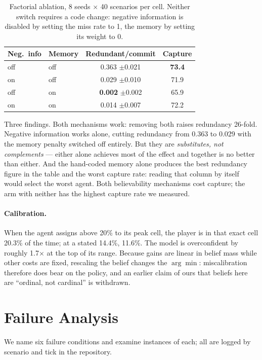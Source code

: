 \documentclass{article}
\begin{document}
\begin{table}[t]
\centering
\small
\begin{tabular}{@{}llcc@{}}
\toprule
Neg.\ info & Memory & Redundant/commit & Capture \\
\midrule
off & off & 0.363 \small{$\pm$0.021} & \textbf{73.4} \\
on  & off & 0.029 \small{$\pm$0.010} & 71.9 \\
off & on  & \textbf{0.002} \small{$\pm$0.002} & 65.9 \\
on  & on  & 0.014 \small{$\pm$0.007} & 72.2 \\
\bottomrule
\end{tabular}
\caption{Factorial ablation, 8 seeds $\times$ 40 scenarios per cell. Neither switch requires a
code change: negative information is disabled by setting the miss rate to 1, the memory by
setting its weight to 0.}
\label{tab:ablation}
\end{table}

Three findings. Both mechanisms work: removing both raises redundancy 26-fold. Negative
information works alone, cutting redundancy from 0.363 to 0.029 with the memory penalty
switched off entirely. But they are \emph{substitutes, not complements} --- either alone
achieves most of the effect and together is no better than either. And the hand-coded memory
alone produces the best redundancy figure in the table and the worst capture rate: reading that
column by itself would select the worst agent. Both believability mechanisms cost capture; the
arm with neither has the highest capture rate we measured.

\paragraph{Calibration.}
When the agent assigns above 20\% to its peak cell, the player is in that exact cell 20.3\% of
the time; at a stated 14.4\%, 11.6\%. The model is overconfident by roughly 1.7$\times$ at the
top of its range. Because gains are linear in belief mass while other costs are fixed,
rescaling the belief changes the $\arg\min$: miscalibration therefore does bear on the policy,
and an earlier claim of ours that beliefs here are ``ordinal, not cardinal'' is withdrawn.

\section{Failure Analysis}
\label{sec:failures}

We name six failure conditions and examine instances of each; all are logged by scenario and
tick in the repository.
\end{document}
